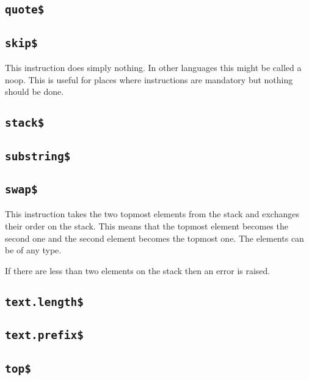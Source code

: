\INCOMPLETE

\subsection{\texttt{quote\$}}

\INCOMPLETE

\subsection{\texttt{skip\$}}

This instruction does simply nothing. In other languages this might be
called a noop. This is useful for places where instructions are
mandatory but nothing should be done.

\subsection{\texttt{stack\$}}

\INCOMPLETE

\subsection{\texttt{substring\$}}

\INCOMPLETE

\subsection{\texttt{swap\$}}

This instruction takes the two topmost elements from the stack and
exchanges their order on the stack. This means that the topmost
element becomes the second one and the second element becomes the
topmost one. The elements can be of any type.

If there are less than two elements on the stack then an error is
raised.

\subsection{\texttt{text.length\$}}

\INCOMPLETE

\subsection{\texttt{text.prefix\$}}

\INCOMPLETE

\subsection{\texttt{top\$}}

